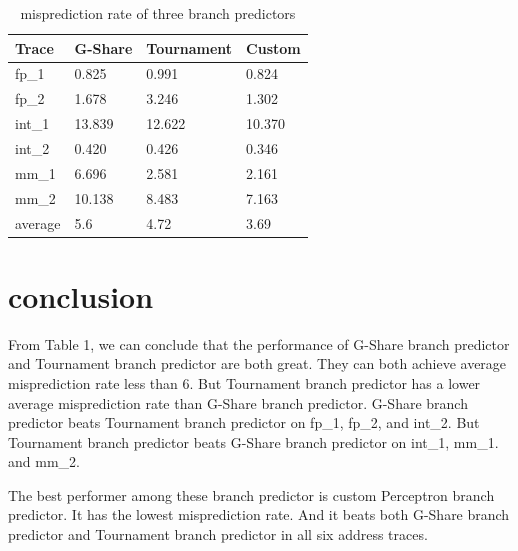 \documentclass[conference]{IEEEtran}
\begin{document}
\begin{scriptsize}
\begin{table}[h!]
  \centering
  \caption{misprediction rate of three branch predictors}
  \label{table:formatting}
  \begin{tabular}{|l|l|l|l|}
    \hline
    \textbf{Trace} & \textbf{G-Share} & \textbf{Tournament} & \textbf{Custom}\\
    \hline
    fp\_1 & 0.825 & 0.991 & 0.824\\
    \hline
    fp\_2 & 1.678 & 3.246 & 1.302\\
    \hline
    int\_1 & 13.839 & 12.622 & 10.370\\
    \hline
    int\_2 & 0.420 & 0.426 & 0.346\\
    \hline
    mm\_1 & 6.696 & 2.581 & 2.161\\
    \hline
    mm\_2 & 10.138 & 8.483 & 7.163\\
    \hline
    average & 5.6 & 4.72 & 3.69\\
    \hline
  \end{tabular}
\end{table}
\end{scriptsize}

\section{conclusion}
From Table 1, we can conclude that the performance of G-Share branch predictor and Tournament branch predictor are both great. They can both achieve average misprediction rate less than 6. But 
Tournament branch predictor has a lower average misprediction rate than G-Share branch predictor. 
G-Share branch predictor beats Tournament branch predictor on fp\_1, fp\_2, and int\_2. But Tournament branch predictor beats G-Share branch predictor on int\_1, mm\_1. and mm\_2. 

The best performer among these branch predictor is custom Perceptron branch predictor. It has the lowest misprediction rate. And it beats both G-Share branch predictor and Tournament branch predictor in all
six address traces.
\end{document}
